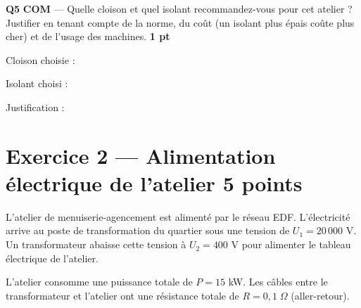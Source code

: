 \documentclass[a4paper,11pt]{article}
\newcommand{\pts}[1]{\hfill\textcolor{gris}{\small\textbf{#1}}}
\newcommand{\comp}[1]{\colorbox{blue!10}{\scriptsize\textbf{#1}}}
\begin{document}
\textbf{Q5} \comp{COM} — Quelle cloison et quel isolant recommandez-vous pour cet atelier ? Justifier en tenant compte de la norme, du coût (un isolant plus épais coûte plus cher) et de l'usage des machines. \pts{1 pt}

\begin{reponsebox}[3.5cm]
Cloison choisie : \dotfill

Isolant choisi : \dotfill

Justification : \dotfill

\dotfill

\dotfill
\end{reponsebox}

\newpage

\section*{Exercice 2 — Alimentation électrique de l'atelier \pts{5 points}}

\begin{contextebox}
L'atelier de menuiserie-agencement est alimenté par le réseau EDF. L'électricité arrive au poste de transformation du quartier sous une tension de $U_1 = 20\,000$ V. Un transformateur abaisse cette tension à $U_2 = 400$ V pour alimenter le tableau électrique de l'atelier.

L'atelier consomme une puissance totale de $P = 15$ kW. Les câbles entre le transformateur et l'atelier ont une résistance totale de $R = 0{,}1\;\Omega$ (aller-retour).
\end{contextebox}

\begin{center}
\end{center}
\end{document}
